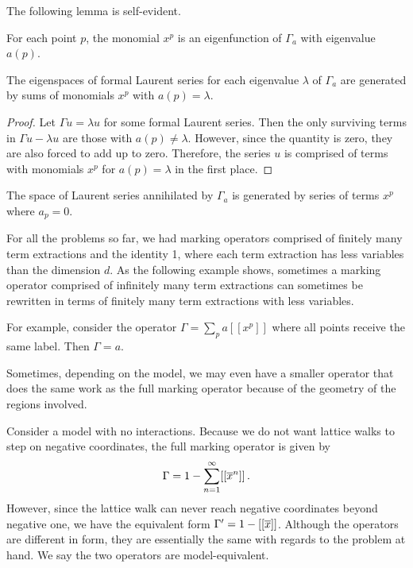 The following lemma is self-evident.

\begin{lem} For each point $p$, the monomial $x^p$ is an eigenfunction of $\Gamma_a$ with eigenvalue $a(p)$.
\end{lem}

\begin{prop} The eigenspaces of formal Laurent series for each eigenvalue $\lambda$ of $\Gamma_a$ are generated by sums of monomials $x^p$ with $a(p) = \lambda$.
\end{prop}
\begin{proof} Let $\Gamma u = \lambda u$ for some formal Laurent series. Then the only surviving terms in $\Gamma u - \lambda u$ are those with $a(p) \neq \lambda$. However, since the quantity is zero, they are also forced to add up to zero. Therefore, the series $u$ is comprised of terms with monomials $x^p$ for $a(p) = \lambda$ in the first place.
\end{proof}

\begin{prop} The space of Laurent series annihilated by $\Gamma_a$ is generated by series of terms $x^p$ where $a_p = 0$.
\end{prop}

For all the problems so far, we had marking operators comprised of finitely many term extractions and the identity 1, where each term extraction has less variables than the dimension $d$. As the following example shows, sometimes a marking operator comprised of infinitely many term extractions can sometimes be rewritten in terms of finitely many term extractions with less variables.
\begin{exa} For example, consider the operator $\Gamma = \sum_p a[[x^p]]$ where all points receive the same label. Then $\Gamma = a$.
\end{exa}

Sometimes, depending on the model, we may even have a smaller operator that does the same work as the full marking operator because of the geometry of the regions involved.
\begin{exa} Consider a \classic \oneD model with no interactions. Because we do not want lattice walks to step on negative coordinates, the full marking operator is given by
\begin{align}
	\Gamma = 1 - \sum_{n=1}^\infty [[\overline{x}^n]]\,.
\end{align}
However, since the lattice walk can never reach negative coordinates beyond negative one, we have the equivalent form $\Gamma' = 1 - [[\overline{x}]]$. Although the operators are different in form, they are essentially the same with regards to the problem at hand. We say the two operators are model-equivalent.
\end{exa}

